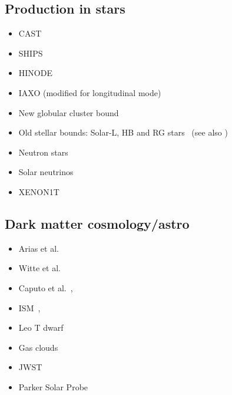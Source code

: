 \documentclass[8pt,twocolumn]{extarticle}
\begin{document}
\begin{mdframed}
\subsection*{Production in stars}\vspace{-0.5em}
\begin{itemize}\setlength\itemsep{-0.5em}
\item CAST~\cite{Redondo:2008aa}
\item SHIPS~\cite{Schwarz:2015lqa} 
\item HINODE~\cite{Frerick:2022mjg}
\item IAXO (modified for longitudinal mode)~\cite{OShea:2023gqn}
\item New globular cluster bound~\cite{Dolan:2023cjs}
\item Old stellar bounds: Solar-L, HB and RG stars~\cite{Li:2023vpv} (see also \cite{Redondo:2013lna})
\item Neutron stars~\cite{Hong:2020bxo}
\item Solar neutrinos~\cite{Vinyoles:2015aba}
\item XENON1T~\cite{XENON:2021myl}
\end{itemize}



\subsection*{Dark matter cosmology/astro}\vspace{-0.5em}
\begin{itemize}\setlength\itemsep{-0.5em}
\item  Arias et al.~\cite{Arias:2012az}
\item Witte et al.~\cite{McDermott:2019lch,Witte:2020rvb}
 \item  Caputo et al.~\cite{Caputo:2020rnx,Caputo:2020bdy}, 
 \item  ISM~\cite{Dubovsky:2015cca},
 \item  Leo T dwarf~\cite{Wadekar:2019xnf}
 \item  Gas clouds~\cite{Wadekar:2019xnf,Bhoonah:2018gjb}
 \item JWST~\cite{An:2024kls}
 \item Parker Solar Probe~\cite{An:2024wmc}
\end{itemize}



\end{mdframed}
\end{document}
